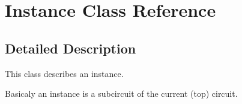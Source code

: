 \hypertarget{class_instance}{}\section{Instance Class Reference}
\label{class_instance}


\subsection{Detailed Description}
This class describes an instance.

Basicaly an instance is a subcircuit of the current (top) circuit. 